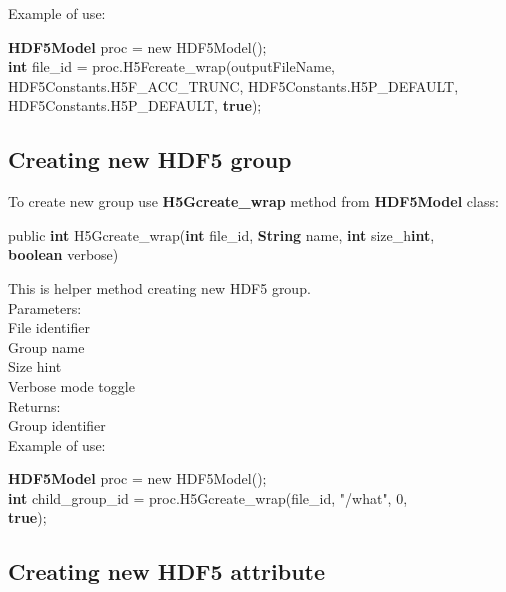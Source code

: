 \documentclass[11p]{article}
\begin{document}
Example of use:
\begin{kod}
{\bf HDF5Model} proc = new HDF5Model();\\
{\bf int} file\_id = proc.H5Fcreate\_wrap(outputFileName,\\
\hspace*{0.5cm}HDF5Constants.H5F\_ACC\_TRUNC, HDF5Constants.H5P\_DEFAULT,\\
\hspace*{0.5cm}HDF5Constants.H5P\_DEFAULT, {\bf true});
\end{kod}

\subsection{Creating new HDF5 group}

To create new group use {\bf H5Gcreate\_wrap} method from {\bf HDF5Model} class:
\begin{kod}
public {\bf int} H5Gcreate\_wrap({\bf int} file\_id, {\bf String} name, {\bf
int} size\_h{\bf int},\\
\hspace*{0.5cm} {\bf boolean} verbose)
\end{kod}
This is helper method creating new HDF5 group.\\
Parameters:\\
\hspace*{0.5cm}{\bf file\_id} File identifier\\
\hspace*{0.5cm}{\bf name} Group name\\
\hspace*{0.5cm}{\bf size\_hint} Size hint\\
\hspace*{0.5cm}{\bf verbose} Verbose mode toggle\\
Returns:\\
\hspace*{0.5cm}Group identifier\\

Example of use:
\begin{kod}
{\bf HDF5Model} proc = new HDF5Model();\\
{\bf int} child\_group\_id = proc.H5Gcreate\_wrap(file\_id, "/what", 0,\\
\hspace*{0.5cm} {\bf true});
\end{kod}

\subsection{Creating new HDF5 attribute}
\end{document}
